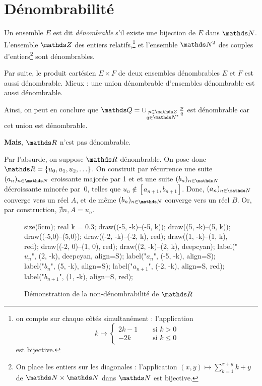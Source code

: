 \setcounter{section}{-1}
\section{Dénombrabilité}

\begin{rmk}
	Un ensemble $E$\/ est dit \textit{dénombrable} s'il existe une bijection de $E$\/ dans $\N$. L'ensemble $\Z$\/ des entiers relatifs,\footnote{on compte sur chaque côtés simultanément : l'application \[
		k \longmapsto \begin{cases}
			2k - 1 &\quad \text{ si } k > 0\\
			-2k &\quad \text{ si } k \le 0
		\end{cases}
	\] est bijective.}  et l'ensemble $\N^2$\/ des couples d'entiers\footnote{On place les entiers sur les diagonales : l'application $(x,y) \mapsto \sum_{k=1}^{x+y} k + y$\/ de $\N \times \N$\/ dans $\N$\/ est bijective.} sont dénombrables.

	Par suite, le produit cartésien $E \times F$\/ de deux ensembles dénombrables $E$\/ et $F$\/ est aussi dénombrable. Mieux : une union dénombrable d'ensembles dénombrable est aussi dénombrable.

	Ainsi, on peut en conclure que $\Q = \cup_{\substack{p \in \Z\\ q \in \N^*}} \frac{p}{q}$\/ est dénombrable car cet union est dénombrable.

	\textbf{Mais}, $\R$\/ n'est pas dénombrable.
\end{rmk}

\begin{prv}
	Par l'absurde, on suppose $\R$\/ dénombrable. On pose donc $\R = \{u_0,u_1, u_2,\ldots\}$. On construit par récurrence une suite $(a_n)_{n\in\N}$\/ croissante majorée par 1 et et une suite $(b_n)_{n\in\N}$\/ décroissante minorée par~0, telles que $u_n \not\in [a_{n+1}, b_{n+1}]$. Donc, $(a_n)_{n\in\N}$\/ converge vers un réel $A$, et de même $(b_n)_{n\in\N}$ converge vers un réel $B$. Or, par construction, $\nexists n, A = u_n$.
	\begin{figure}[H]
		\centering
		\begin{asy}
			size(5cm);
			real k = 0.3;
			draw((-5, -k)--(-5, k));
			draw((5, -k)--(5, k));
			draw((-5,0)--(5,0));
			draw((-2, -k)--(-2, k), red);
			draw((1, -k)--(1, k), red);
			draw((-2, 0)--(1, 0), red);
			draw((2, -k)--(2, k), deepcyan);
			label("$u_n$", (2, -k), deepcyan, align=S);
			label("$a_n$", (-5, -k), align=S);
			label("$b_n$", (5, -k), align=S);
			label("$a_{n+1}$", (-2, -k), align=S, red);
			label("$b_{n+1}$", (1, -k), align=S, red);
		\end{asy}
		\caption{Démonstration de la non-dénombrabilité de $\R$}
	\end{figure}
\end{prv}

